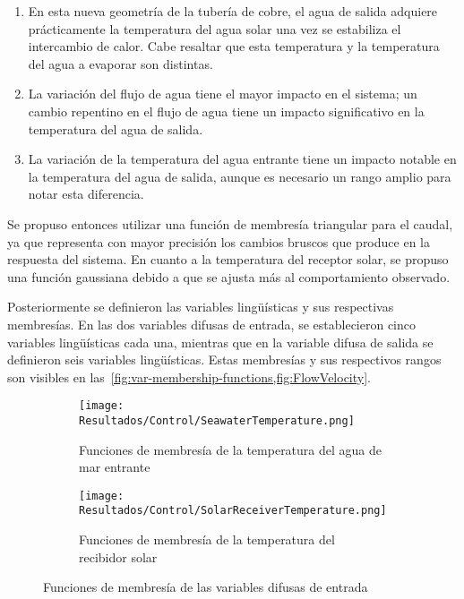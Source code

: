 			\begin{enumerate}
				\item En esta nueva geometría de la tubería de cobre, el agua de salida adquiere prácticamente la temperatura del agua solar una vez se estabiliza el intercambio de calor. Cabe resaltar que esta temperatura y la temperatura del agua a evaporar son distintas.
				\item La variación del flujo de agua tiene el mayor impacto en el sistema; un cambio repentino en el flujo de agua tiene un impacto significativo en la temperatura del agua de salida.
				\item La variación de la temperatura del agua entrante tiene un impacto notable en la temperatura del agua de salida, aunque es necesario un rango amplio para notar esta diferencia.
			\end{enumerate} 
						
			Se propuso entonces utilizar una función de membresía triangular para el caudal, ya que representa con mayor precisión los cambios bruscos que produce en la respuesta del sistema. En cuanto a la temperatura del receptor solar, se propuso una función gaussiana debido a que se ajusta más al comportamiento observado.
			
			Posteriormente se definieron las variables lingüísticas y sus respectivas membresías. En las dos variables difusas de entrada, se establecieron cinco variables lingüísticas cada una, mientras que en la variable difusa de salida se definieron seis variables lingüísticas. Estas membresías y sus respectivos rangos son visibles en las~\cref{fig:var-membership-functions,fig:FlowVelocity}.
			
			\begin{figure}[H]
				\centering
				\begin{subfigure}[t]{0.45\linewidth}
					\centering
					\texttt{[image: Resultados/Control/SeawaterTemperature.png]}
					\caption{Funciones de membresía de la temperatura del agua de mar entrante}
					\label{fig:SeawaterTemperature}
				\end{subfigure}
				\hfill
				\begin{subfigure}[t]{0.45\linewidth}
					\centering
					\texttt{[image: Resultados/Control/SolarReceiverTemperature.png]}
					\caption{Funciones de membresía de la temperatura del recibidor solar}
					\label{fig:SolarReceiverTemperature}
				\end{subfigure}
				\caption{Funciones de membresía de las variables difusas de entrada}
				\label{fig:var-membership-functions}
			\end{figure}
			
